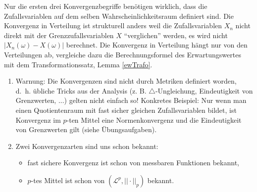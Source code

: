 Nur die ersten drei Konvergenzbegriffe ben\"otigen wirklich, dass die Zufallsvariablen auf dem selben Wahrscheinlichkeitsraum definiert sind. Die Konvergenz in Verteilung ist strukturell anders weil die Zufallsvariablen $X_n$ nicht direkt mit der Grenzzufallsvariablen $X$ \enquote{verglichen} werden, es wird nicht $|X_n(\omega)-X(\omega)|$ berechnet. Die Konvergenz in Verteilung h\"angt nur von den Verteilungen ab, vergleiche dazu die Berechnungsformel des Erwartungswertes mit dem Transformationssatz, Lemma \ref{ewTrafo}.
\begin{bem}  \abs
	\begin{enumerate}[label=(\roman*)]
		\item Warnung: Die Konvergenzen sind nicht durch Metriken definiert worden, \mbox{d. h.} \"ubliche Tricks aus der Analysis (z. B. $\triangle$-Ungleichung, Eindeutigkeit von Grenzwerten, ...) gelten nicht einfach so! Konkretes Beispiel: Nur wenn man einen Quotientenraum mit fast sicher gleichen Zufallsvariablen bildet, ist Konvergenz im $p$-ten Mittel eine Normenkonvergenz und die Eindeutigkeit von Grenzwerten gilt (siehe \"Ubungsaufgaben).
		\item Zwei Konvergenzarten sind uns schon bekannt:
		\begin{itemize}
			\item fast sichere Konvergenz ist schon von messbaren Funktionen bekannt,
			\item $p$-tes Mittel ist schon von $(\mathcal L^p, ||\cdot||_p)$ bekannt.
		\end{itemize}
	\end{enumerate}
\end{bem}

